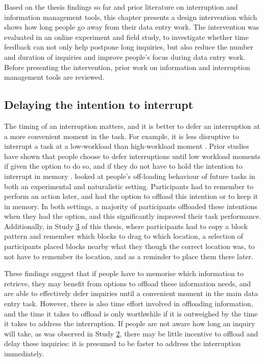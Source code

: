 Based on the thesis findings so far and prior literature on interruption and information management tools, this chapter presents a design intervention which shows how long people go away from their data entry work. The intervention was evaluated in an online experiment and field study, to investigate whether time feedback can not only help postpone long inquiries, but also reduce the number and duration of inquiries and improve people’s focus during data entry work. Before presenting the intervention, prior work on information and interruption management tools are reviewed. 

\subsection{Delaying the intention to interrupt}
The timing of an interruption matters, and it is better to defer an interruption at a more convenient moment in the task. For example, it is less disruptive to interrupt a task at a low-workload than high-workload moment \citep{Gould2013a, Iqbal2005}. Prior studies have shown that people choose to defer interruptions until low workload moments if given the option to do so, and if they do not have to hold the intention to interrupt in memory \citep{Gilbert2015, Salvucci2010}. \citet{Gilbert2015} looked at people’s off-loading behaviour of future tasks in both an experimental and naturalistic setting. Participants had to remember to perform an action later, and had the option to offload this intention or to keep it in memory. In both settings, a majority of participants offloaded these intentions when they had the option, and this significantly improved their task performance. Additionally, in Study \hyperref[st:Study3]{3} of this thesis, where participants had to copy a block pattern and remember which blocks to drag to which location, a selection of participants placed blocks nearby what they though the correct location was, to not have to remember its location, and as a reminder to place them there later. 

These findings suggest that if people have to memorise which information to retrieve, they may benefit from options to offload these information needs, and are able to effectively defer inquiries until a convenient moment in the main data entry task. However, there is also time effort involved in offloading information, and the time it takes to offload is only worthwhile if it is outweighed by the time it takes to address the interruption. If people are not aware how long an inquiry will take, as was observed in Study \hyperref[st:Study2]{2}, there may be little incentive to offload and delay these inquiries: it is presumed to be faster to address the interruption immediately.

